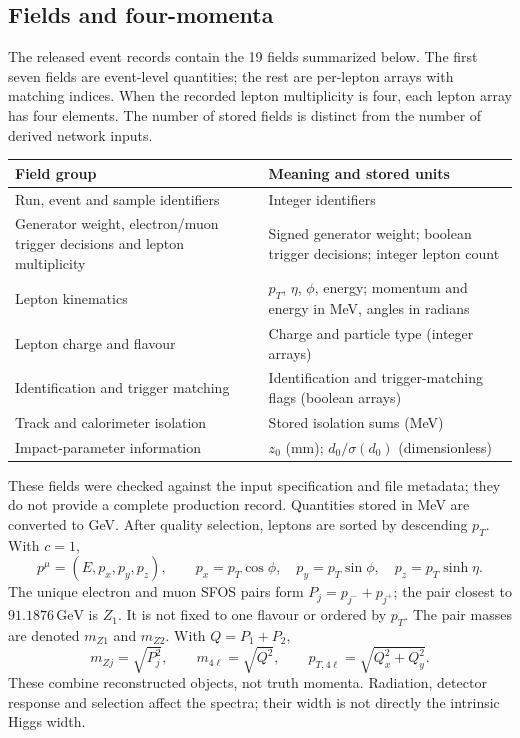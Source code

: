 \documentclass[11pt,a4paper]{article}
\newcommand{\gev}{\,\mathrm{GeV}}
\begin{document}
\subsection{Fields and four-momenta}
The released event records contain the 19 fields summarized below. The first seven fields are event-level quantities; the rest are per-lepton arrays with matching indices.
When the recorded lepton multiplicity is four, each lepton array has four elements. The number of stored fields is distinct from the number of derived network inputs.

\begingroup
\small
\renewcommand{\arraystretch}{1.13}
\begin{tabularx}{\linewidth}{@{}p{.53\linewidth}Y@{}}
\toprule
Field group & Meaning and stored units \\
\midrule
Run, event and sample identifiers & Integer identifiers \\
Generator weight, electron/muon trigger decisions and lepton multiplicity & Signed generator weight; boolean trigger decisions; integer lepton count \\
Lepton kinematics & $p_T$, $\eta$, $\phi$, energy; momentum and energy in MeV, angles in radians \\
Lepton charge and flavour & Charge and particle type (integer arrays) \\
Identification and trigger matching & Identification and trigger-matching flags (boolean arrays) \\
Track and calorimeter isolation & Stored isolation sums (MeV) \\
Impact-parameter information & $z_0$ (mm); $d_0/\sigma(d_0)$ (dimensionless) \\
\bottomrule
\end{tabularx}
\par
\endgroup

These fields were checked against the input specification and file metadata; they do not provide a complete production record. Quantities stored in MeV are converted to GeV.
After quality selection, leptons are sorted by descending $p_T$. With $c=1$,
\[
 p^\mu=(E,p_x,p_y,p_z),\qquad
 p_x=p_T\cos\phi,\quad p_y=p_T\sin\phi,\quad p_z=p_T\sinh\eta.
\]
The unique electron and muon SFOS pairs form $P_j=p_{j^-}+p_{j^+}$; the pair closest to $91.1876\gev$ is $Z_1$.
It is not fixed to one flavour or ordered by $p_T$. The pair masses are denoted $m_{Z1}$ and $m_{Z2}$.
With $Q=P_1+P_2$,
\[
 m_{Zj}=\sqrt{P_j^2},\qquad m_{4\ell}=\sqrt{Q^2},\qquad
 p_{T,4\ell}=\sqrt{Q_x^2+Q_y^2}.
\]
These combine reconstructed objects, not truth momenta. Radiation, detector response and selection affect the spectra; their width is not directly the intrinsic Higgs width.
\end{document}
